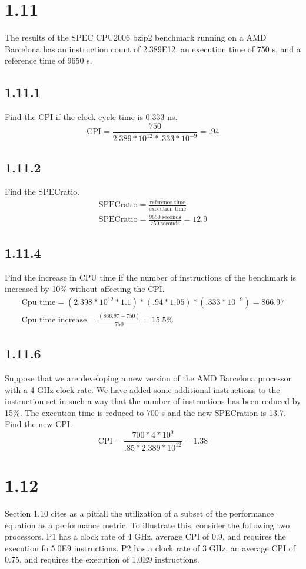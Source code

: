 \documentclass[12pt]{article}
\begin{document}
\section*{1.11}
The results of the SPEC CPU2006 bzip2 benchmark running on a AMD Barcelona has an 
instruction count of 2.389E12, an execution time of 750 s, and a reference time
of 9650 s.

\subsection*{1.11.1}
Find the CPI if the clock cycle time is 0.333 ns.
\[
\text{CPI} = \frac{750}{2.389*10^{12}*.333*10^{-9}} = .94
\]

\subsection*{1.11.2}
Find the SPECratio.
\begin{gather*}
	\text{SPECratio} = \frac{\text{reference time}}{\text{execution time}}\\
	\text{SPECratio} = \frac{9650\;\text{seconds}}{750\;\text{seconds}} = 12.9
\end{gather*}

\subsection*{1.11.4}
Find the increase in CPU time if the number of instructions of the benchmark is increased by 10\% without affecting the CPI.
\begin{gather*}
	\text{Cpu time} = (2.398*10^{12}*1.1)*(.94*1.05)*(.333*10^{-9}) = 866.97\\
	\text{Cpu time increase} = \frac{(866.97-750)}{750} = 15.5\%
\end{gather*}

\subsection*{1.11.6}
Suppose that we are developing a new version of the AMD
Barcelona processor with a 4 GHz clock rate.  We have added some additional
instructions to the instruction set in such a way that the number of instructions
has been reduced by 15\%.  The execution time is reduced to 700 s and the new
SPECration is 13.7.  Find the new CPI.
\[
\text{CPI} = \frac{700*4*10^9}{.85*2.389*10^{12}} = 1.38
\]

\section*{1.12}
Section 1.10 cites as a pitfall the utilization of a subset of the performance
equation as a performance metric.  To illustrate this, consider the following two processors.  P1 has a clock rate of 4 GHz, average CPI of 0.9, and requires the 
execution fo 5.0E9 instructions.  P2 has a clock rate of 3 GHz, an average CPI of
0.75, and requires the execution of 1.0E9 instructions.
\end{document}
